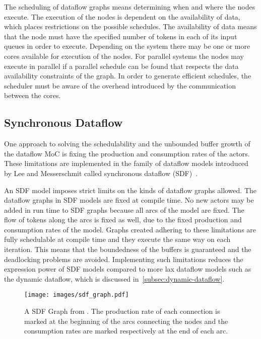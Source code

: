 The scheduling of dataflow graphs means determining when and where the nodes execute. The execution of the nodes is dependent on the availability of data, which places restrictions on the possible schedules. The availability of data means that the node must have the specified number of tokens in each of its input queues in order to execute. Depending on the system there may be one or more cores available for execution of the nodes. For parallel systems the nodes may execute in parallel if a parallel schedule can be found that respects the data availability constraints of the graph. In order to generate efficient schedules, the scheduler must be aware of the overhead introduced by the communication between the cores.~\cite{lee1987synchronous}

\subsection{Synchronous Dataflow}
\label{subsec:synchronous-dataflow}
\FloatBarrier
One approach to solving the schedulability and the unbounded buffer growth of the dataflow MoC is fixing the production and consumption rates of the actors. These limitations are implemented in the family of dataflow models introduced by Lee and Messerschmit called synchronous dataflow (SDF)~\cite{lee1987synchronous}.

An SDF model imposes strict limits on the kinds of dataflow graphs allowed. The dataflow graphs in SDF models are fixed at compile time. No new actors may be added in run time to SDF graphs because all arcs of the model are fixed. The flow of tokens along the arcs is fixed as well, due to the fixed production and consumption rates of the model. Graphs created adhering to these limitations are fully schedulable at compile time and they execute the same way on each iteration. This means that the boundedness of the buffers is guaranteed and the deadlocking problems are avoided. Implementing such limitations reduces the expression power of SDF models compared to more lax dataflow models such as the dynamic dataflow, which is discussed in~\ref{subsec:dynamic-dataflow}.~\cite{lee2015introduction}

\begin{figure}[h!]
    \begin{center}
        \texttt{[image: images/sdf\_graph.pdf]}
        \caption{A SDF Graph from \cite{ade1997data}. The production rate of each connection is marked at the beginning of the arcs connecting the nodes and the consumption rates are marked respectively at the end of each arc.}
        \label{fig:sdf_graph}
    \end{center}
\end{figure}


